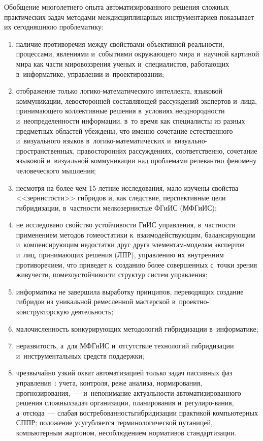 \begin{multicols}{2}
  Обобщение многолетнего опыта автоматизированного решения сложных практических 
задач методами междисциплинарных инструментариев показывает их сегодняшнюю 
проблематику:
\begin{enumerate}[(1)]
\item наличие противоречия между свойствами объективной реальности, 
процессами, явлениями и~событиями окружающего мира и~научной картиной мира как части 
мировоззрения ученых и~специалистов, работающих в~информатике, управлении 
и~проектировании; 
\item отображение только ло\-ги\-ко-ма\-те\-ма\-ти\-че\-ско\-го интеллекта, языковой 
коммуникации, левосторонней составляющей рассуждений экспертов и~лица, принимающего 
коллективные решения в~условиях неоднородности и~неопределенности информации, в~то 
время как специалисты из разных предметных областей убеж\-де\-ны, что именно сочетание 
естественного и~визуального языков в~ло\-ги\-ко-ма\-те\-ма\-ти\-че\-ских  
и~ви\-зу\-аль\-но-про\-стран\-ст\-вен\-ных, правосторонних рассуждениях, соответственно, 
сочетание языковой и~визуальной коммуникации над проблемами релевантно феномену 
человеческого мышления; 
\item несмотря на более чем 15-лет\-ние исследования, мало изучены 
свойства <<зернистости>> гиб\-ри\-дов и, как следствие, перспективные цели гиб\-ри\-ди\-за\-ции, 
в~частности мелкозернистые ФГиИС  (МФГиИС); 
\item не исследовано свойство устойчивости ГиИС управ\-ле\-ния, 
в~частности применением методов гомеостатики 
к~взаимодействующим, балансирующим и~компенсирующим недостатки друг друга  
эле\-мен\-там-мо\-де\-лям экспертов и~лиц, принимающих решения (ЛПР), управ\-ле\-нию 
их внут\-рен\-ним противоречием, что 
приведет к~созданию более совершенных с~точки зрения живучести, по\-ме\-хо\-устой\-чи\-вости 
структур сис\-тем управ\-ле\-ния; 
\item информатика не завершила выработку принципов, 
переводящих создание гибридов из уникальной ремесленной мастерской 
  в~про\-ект\-но-кон\-ст\-рук\-тор\-скую деятельность; 
  \item малочисленность конкурирующих 
методологий гибридизации в~информатике; 
\item неразвитость, а~для МФГиИС и~отсутствие 
технологий гибридизации и~инструментальных средств поддержки; 
\item чрезвычайно узкий 
охват автоматизацией только задач пассивных фаз управления~\cite{7-kir}: учета, контроля, 
реже анализа, нормирования, прогнозирования,~--- и~непонимание актуальности 
автоматизированного решения сложных\linebreak задач организации, планирования 
и~регулиро-\linebreak вания, 
а~отсюда~--- слабая вос\-тре\-бо\-ван\-ность\linebreak гиб\-ри\-ди\-за\-ции практикой компьютерных  
\mbox{СППР}; положение усугубляется терминологической путаницей, 
компьютерным жаргоном, несоблюдением нормативов стандартизации. 
\end{enumerate}
  

\end{multicols}
